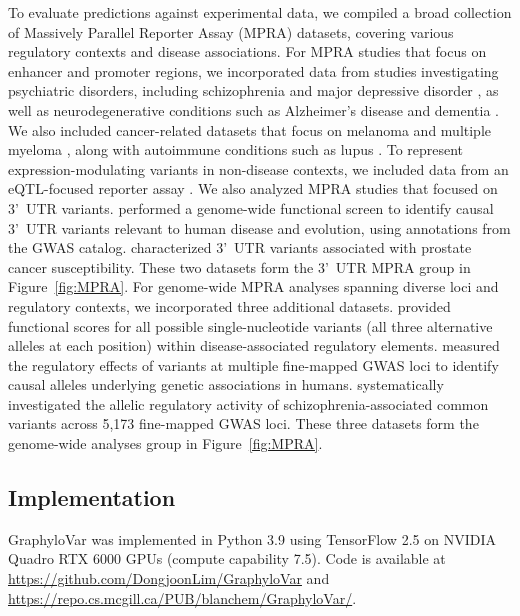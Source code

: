 \documentclass[unnumsec,webpdf,contemporary,large]{oup-authoring-template}%
\newcommand{\rev}[1]{{\color{red}#1}}
\theoremstyle{thmstyleone}%
\theoremstyle{thmstyletwo}%
\theoremstyle{thmstylethree}%
\begin{document}
To evaluate predictions against experimental data, we compiled a broad collection of Massively Parallel Reporter Assay (MPRA) datasets, covering various regulatory contexts and disease associations.
For MPRA studies that focus on enhancer and promoter regions, we incorporated data from studies investigating psychiatric disorders, including schizophrenia \citep{Myint2020} and major depressive disorder \citep{Mulvey2021}, as well as neurodegenerative conditions such as Alzheimer's disease and dementia \citep{Myint2020, Cooper2022}. We also included cancer-related datasets that focus on melanoma \citep{Long2022, Choi2020} and multiple myeloma \citep{Ajore2022}, along with autoimmune conditions such as lupus \citep{Lu2021}. To represent expression-modulating variants in non-disease contexts, we included data from an eQTL-focused reporter assay \citep{Tewhey2016}.
\rev{We also analyzed MPRA studies that focused on 3'~UTR variants. \citet{Griesemer2021} performed a genome-wide functional screen to identify causal 3'~UTR variants relevant to human disease and evolution, using annotations from the GWAS catalog. \citet{Schuster2023} characterized 3'~UTR variants associated with prostate cancer susceptibility. These two datasets form the 3'~UTR MPRA group in Figure~\ref{fig:MPRA}.}
\rev{For genome-wide MPRA analyses spanning diverse loci and regulatory contexts, we incorporated three additional datasets. \citet{Kircher2019} provided functional scores for all possible single-nucleotide variants (all three alternative alleles at each position) within disease-associated regulatory elements. \citet{Abell2022} measured the regulatory effects of variants at multiple fine-mapped GWAS loci to identify causal alleles underlying genetic associations in humans. \citet{McAfee2023} systematically investigated the allelic regulatory activity of schizophrenia-associated common variants across 5{,}173 fine-mapped GWAS loci. These three datasets form the genome-wide analyses group in Figure~\ref{fig:MPRA}.}

\subsection{Implementation}

GraphyloVar was implemented in Python 3.9 using TensorFlow 2.5 on NVIDIA Quadro RTX 6000 GPUs (compute capability 7.5). Code is available at \url{https://github.com/DongjoonLim/GraphyloVar} and \url{https://repo.cs.mcgill.ca/PUB/blanchem/GraphyloVar/}. %
\end{document}
